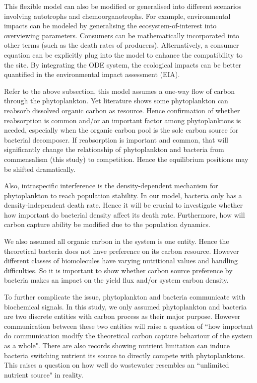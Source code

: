 \documentclass[../thesis.tex]{subfiles} %
\begin{document}
This flexible model can also be modified or generalised into different scenarios involving autotrophs and chemoorganotrophs.  For example, environmental impacts can be modeled by generalising the ecosystem-of-interest into overviewing parameters.  Consumers can be mathematically incorporated into other terms (such as the death rates of producers).\autocite{hurtt1996pelagic}  Alternatively, a consumer equation can be explicitly plug into the model to enhance the compatibility to the site.  By integrating the ODE system, the ecological impacts can be better quantified in the environmental impact assessment (EIA).

Refer to the above subsection, this model assumes a one-way flow of carbon through the phytoplankton.  Yet literature shows some phytoplankton can reabsorb dissolved organic carbon as resource.\autocite{j1989respiration,bratbak1985phytoplankton,samejima1958heterotrophic}  Hence confirmation of whether reabsorption is common and/or an important factor among phytoplanktons is needed, especially when the organic carbon pool is the sole carbon source for bacterial decomposer.  If reabsorption is important and common, that will significantly change the relationship of phytoplankton and bacteria from commensalism (this study) to competition.\autocite{bratbak1985phytoplankton}  Hence the equilibrium positions may be shifted dramatically.

Also, intraspecific interference is the density-dependent mechanism for phytoplankton to reach population stability.\autocite{bernhardt2018metabolic}  In our model, bacteria only has a density-independent death rate.  Hence it will be crucial to investigate whether how important do bacterial density affect its death rate.  Furthermore, how will carbon capture ability be modified due to the population dynamics.

We also assumed all organic carbon in the system is one entity.  Hence the theoretical bacteria does not have preference on its carbon resource.  However different classes of biomolecules have varying nutritional values and handling difficulties.\autocite{amon1996bacterial}  So it is important to show whether carbon source preference by bacteria makes an impact on the yield flux and/or system carbon density.

To further complicate the issue, phytoplankton and bacteria communicate with biochemical signals.\autocite{beliaev2014inference,amin2012interactions}  In this study, we only assumed phytoplankton and bacteria are two discrete entities with carbon process as their major purpose.  However communication between these two entities will raise a question of ``how important do communication modify the theoretical carbon capture behaviour of the system as a whole".  There are also records showing nutrient limitation can induce bacteria switching nutrient its source to directly compete with phytoplanktons.\autocite{danger2007bacteria}  This raises a question on how well do wastewater resembles an ``unlimited nutrient source" in reality.
\end{document}
